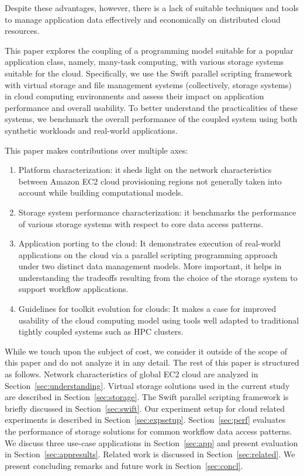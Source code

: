 \documentclass{sig-alternate}
\begin{document}
Despite these advantages, however, there is a lack of suitable techniques and
tools to manage application data effectively and economically on distributed
cloud resources.

This paper explores the coupling of a programming model suitable for a popular
application class, namely, many-task computing, with various storage
systems suitable for the cloud. Specifically, we use the Swift
parallel scripting framework with virtual storage and file management systems
(collectively, storage systems) in cloud computing environments and
assess their impact on application performance and overall usability. To better
understand the practicalities of these systems, we benchmark the overall
performance of the coupled system using both synthetic workloads and real-world
applications.

This paper makes contributions over multiple axes: 

\begin{enumerate}
\item Platform characterization: it sheds light on the network characteristics
    between Amazon EC2 cloud provisioning regions not generally taken into
    account while building computational models.

\item Storage system performance characterization: it benchmarks the
performance of various storage systems with respect to core data
access patterns. 

\item Application porting to the cloud: It demonstrates execution of real-world
applications on the cloud via a parallel scripting programming approach under
two distinct data management models. More important, it helps in
understanding the tradeoffs resulting from the choice of the storage
system to support workflow applications. 

\item Guidelines for toolkit evolution for clouds: It makes a case for
improved usability of the cloud computing model using tools well adapted to
traditional tightly coupled systems such as HPC clusters. 
\end{enumerate}

While we touch upon the subject of cost, we consider it outside of the scope of
this paper and do not analyze it in any detail. The rest of this paper is
structured as follows.  Network characteristics of global EC2 cloud are
analyzed in Section~\ref{sec:understanding}. Virtual storage solutions used in
the current study are described in Section~\ref{sec:storage}. The Swift
parallel scripting framework is briefly discussed in Section~\ref{sec:swift}.
Our experiment setup for cloud related experiments is described in
Section~\ref{sec:expsetup}.  Section~\ref{sec:perf} evaluates the performance
of storage solutions for common workflow data access patterns.  We discuss
three use-case applications in Section~\ref{sec:app} and present evaluation in
Section~\ref{sec:appresults}. Related work is discussed in
Section~\ref{sec:related}. We present concluding remarks and future work in
Section~\ref{sec:concl}.
\end{document}

